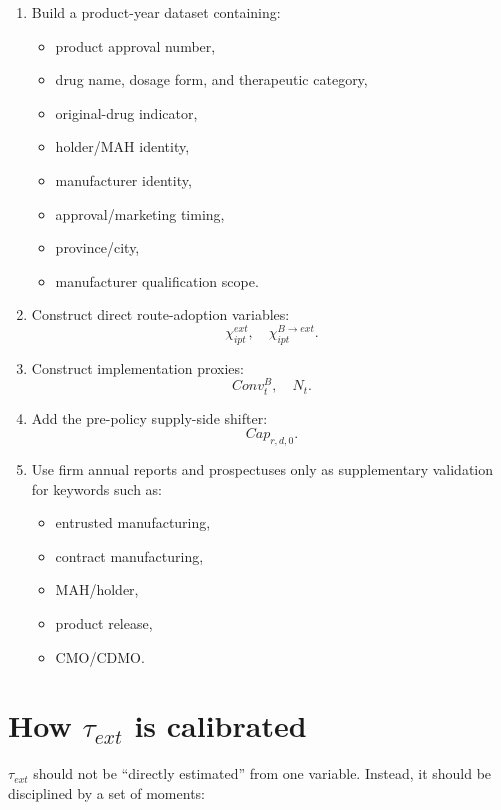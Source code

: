 \documentclass[12pt]{ctexart}
\begin{document}
\begin{enumerate}[leftmargin=2em]
    \item Build a product-year dataset containing:
    \begin{itemize}[leftmargin=2em]
        \item product approval number,
        \item drug name, dosage form, and therapeutic category,
        \item original-drug indicator,
        \item holder/MAH identity,
        \item manufacturer identity,
        \item approval/marketing timing,
        \item province/city,
        \item manufacturer qualification scope.
    \end{itemize}

    \item Construct direct route-adoption variables:
    \[
    \chi^{ext}_{ipt}, \quad \chi^{B\to ext}_{ipt}.
    \]

    \item Construct implementation proxies:
    \[
    Conv^B_t, \quad N_t.
    \]

    \item Add the pre-policy supply-side shifter:
    \[
    Cap_{r,d,0}.
    \]

    \item Use firm annual reports and prospectuses only as supplementary validation for
    keywords such as:
    \begin{itemize}[leftmargin=2em]
        \item entrusted manufacturing,
        \item contract manufacturing,
        \item MAH/holder,
        \item product release,
        \item CMO/CDMO.
    \end{itemize}
\end{enumerate}

\section{How \texorpdfstring{$\tau_{ext}$}{tau\_ext} is calibrated}

\(\tau_{ext}\) should not be ``directly estimated'' from one variable.
Instead, it should be disciplined by a set of moments:
\end{document}
